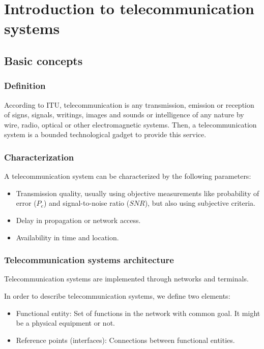 \documentclass[
	12pt,
	twoside
]{book}
\begin{document}
\tableofcontents

\chapter{Introduction to telecommunication systems}

\section{Basic concepts}

\subsection{Definition}

According to ITU, telecommunication is any transmission, emission or reception of signs, signals, writings, images and sounds or intelligence of any nature by wire, radio, optical or other electromagnetic systems. Then, a telecommunication system is a bounded technological gadget to provide this service.

\subsection{Characterization}

A telecommunication system can be characterized by the following parameters:

\begin{itemize}
	\item Transmission quality, usually using objective measurements like probability of error ($P_e$) and signal-to-noise ratio ($SNR$), but also using subjective criteria.
	\item Delay in propagation or network access.
	\item Availability in time and location.
\end{itemize}

\subsection{Telecommunication systems architecture}

Telecommunication systems are implemented through networks and terminals.

In order to describe telecommunication systems, we define two elements:

\begin{itemize}
	\item Functional entity: Set of functions in the network with common goal. It might be a physical equipment or not.
	\item Reference points (interfaces): Connections between functional entities.
\end{itemize}
\end{document}
